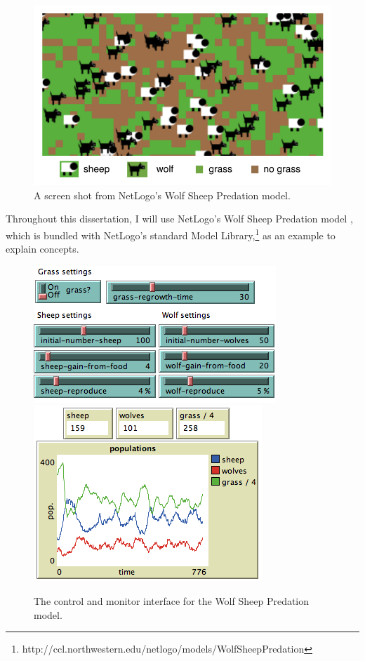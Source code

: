 \begin{figure}[ht]
\centering
\includegraphics{images/intro_wolfsheep.pdf}
\caption{A screen shot from NetLogo's Wolf Sheep Predation model.}
\label{fig:wolfsheep}
\end{figure}



Throughout this dissertation, I will use NetLogo's Wolf Sheep Predation model \cite{wolfsheep}, which is bundled with NetLogo's standard Model Library,\footnote{http://ccl.northwestern.edu/netlogo/models/WolfSheepPredation} as an example to explain concepts.

\begin{figure}[ht]
\centering
\includegraphics[scale=.66667]{images/wolfsheepcontrols.png}
\includegraphics[scale=.66667]{images/wolfsheepmons.png}
\caption{The control and monitor interface for the Wolf Sheep Predation model.}
\label{fig:wolfsheepui}
\end{figure}

